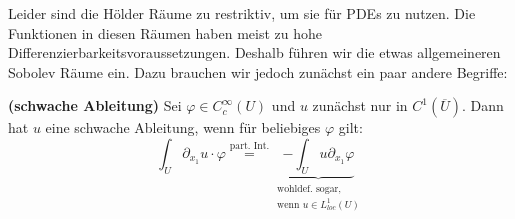 Leider sind die Hölder Räume zu restriktiv, um sie für PDEs zu nutzen. Die Funktionen in diesen Räumen haben meist zu hohe Differenzierbarkeitsvoraussetzungen. Deshalb führen wir die etwas allgemeineren Sobolev Räume ein. Dazu brauchen wir jedoch zunächst ein paar andere Begriffe:

\begin{definition}\textbf{(schwache Ableitung)}\enter
	Sei $\varphi\in C^\infty_c(U)$ und $u$ zunächst nur in $C^1(\overline{U})$. Dann hat $u$ eine schwache Ableitung, wenn für beliebiges $\varphi$ gilt:
	\[\int_U\partial_{x_1}u\cdot \varphi \stackrel{\text{part. Int.}}{=}
	\underbrace{-\int_U u\partial_{x_1}\varphi}_{\substack{\text{wohldef. sogar,}\\\text{wenn } u\in L^1_{loc}(U)}}\]
\end{definition}
